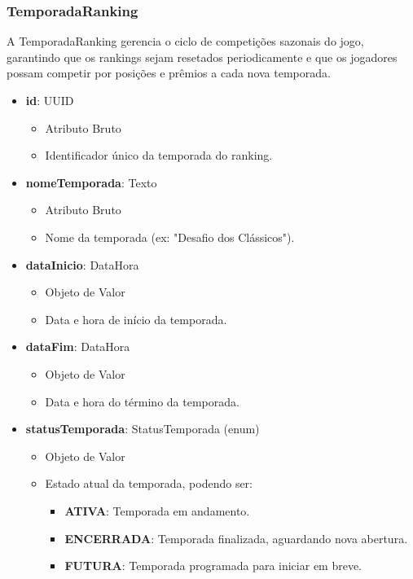     \subsubsection{TemporadaRanking}
    A TemporadaRanking gerencia o ciclo de competições sazonais do jogo, garantindo que os rankings sejam resetados periodicamente e que os jogadores possam competir por posições e prêmios a cada nova temporada.
    \begin{itemize}
        \item \textbf{id}: UUID  
              \begin{itemize}
                  \item Atributo Bruto
                  \item Identificador único da temporada do ranking.
              \end{itemize}
    
        \item \textbf{nomeTemporada}: Texto  
              \begin{itemize}
                  \item Atributo Bruto
                  \item Nome da temporada (ex: "Desafio dos Clássicos").
              \end{itemize}
    
        \item \textbf{dataInicio}: DataHora  
              \begin{itemize}
                  \item Objeto de Valor
                  \item Data e hora de início da temporada.
              \end{itemize}
    
        \item \textbf{dataFim}: DataHora  
              \begin{itemize}
                  \item Objeto de Valor
                  \item Data e hora do término da temporada.
              \end{itemize}
    
        \item \textbf{statusTemporada}: StatusTemporada (enum)  
              \begin{itemize}
                  \item Objeto de Valor
                  \item Estado atual da temporada, podendo ser:
                  \begin{itemize}
                      \item \textbf{ATIVA}: Temporada em andamento.
                      \item \textbf{ENCERRADA}: Temporada finalizada, aguardando nova abertura.
                      \item \textbf{FUTURA}: Temporada programada para iniciar em breve.
                  \end{itemize}
              \end{itemize}
    

\end{itemize}
